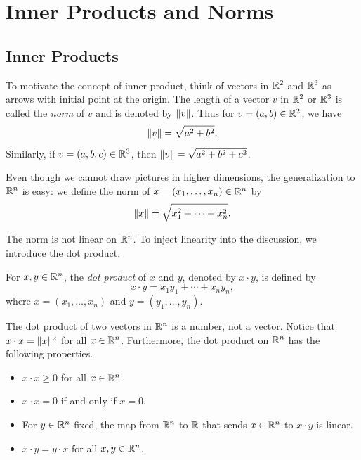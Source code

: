 \providecommand\axeqstep[1]{\refstepcounter{theorem}\label{#1}}
\providecommand\axeqtag{\tag*{\thetheorem}}
\section{Inner Products and Norms}

\subsection{Inner Products}

%
To motivate the concept of inner product, think of vectors in $\mathbb{R}^2$ and $\mathbb{R}^3$
as arrows with initial point at the origin. The length of a vector $v$ in $\mathbb{R}^2$
or $\mathbb{R}^3$ is called the \emph{norm} of $v$ and is denoted by $\lVert v \rVert$. Thus
for $v=(a,b)\in\mathbb{R}^2$, we have
\[ \lVert v \rVert = \sqrt{a^2+b^2}. \]
Similarly, if $v=(a,b,c)\in\mathbb{R}^3$, then $\lVert v \rVert=\sqrt{a^2+b^2+c^2}$.

Even though we cannot draw pictures in higher dimensions, the generalization to
$\mathbb{R}^n$ is easy: we define the norm of $x=(x_1,\dots,x_n)\in\mathbb{R}^n$ by
\[ \lVert x \rVert = \sqrt{x_1^2+\cdots+x_n^2}. \]

The norm is not linear on $\mathbb{R}^n$. To inject linearity into the discussion, we
introduce the dot product.

\begin{definition}\label{ax:6.1}
For $x,y\in\mathbb{R}^n$, the \emph{dot product} of $x$ and $y$, denoted by $x\cdot y$,
is defined by
\[ x\cdot y = x_1y_1+\cdots+x_ny_n, \]
where $x=(x_1,\dots,x_n)$ and $y=(y_1,\dots,y_n)$.
\end{definition}

%
The dot product of two vectors in $\mathbb{R}^n$ is a number, not a vector. Notice that
$x\cdot x=\lVert x \rVert^2$ for all $x\in\mathbb{R}^n$. Furthermore, the dot product on $\mathbb{R}^n$
has the following properties.
\begin{itemize}
\item $x\cdot x\ge0$ for all $x\in\mathbb{R}^n$.
\item $x\cdot x=0$ if and only if $x=0$.
\item For $y\in\mathbb{R}^n$ fixed, the map from $\mathbb{R}^n$ to $\mathbb{R}$ that sends $x\in\mathbb{R}^n$
  to $x\cdot y$ is linear.
\item $x\cdot y=y\cdot x$ for all $x,y\in\mathbb{R}^n$.
\end{itemize}

